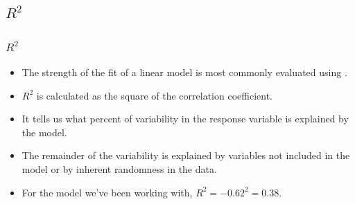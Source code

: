 
\subsection{$R^2$}


\begin{frame}
\frametitle{$R^2$}

\begin{itemize}

\item The strength of the fit of a linear model is most commonly evaluated using .

\pause

\item $R^2$ is calculated as the square of the correlation coefficient.

\pause

\item It tells us what percent of variability in the response variable is explained by the model.

\pause

\item The remainder of the variability is explained by variables not included in the model or by inherent randomness in the data.

\pause

\item For the model we've been working with, $R^2 = -0.62^2 = 0.38$.

\end{itemize}

\end{frame}


